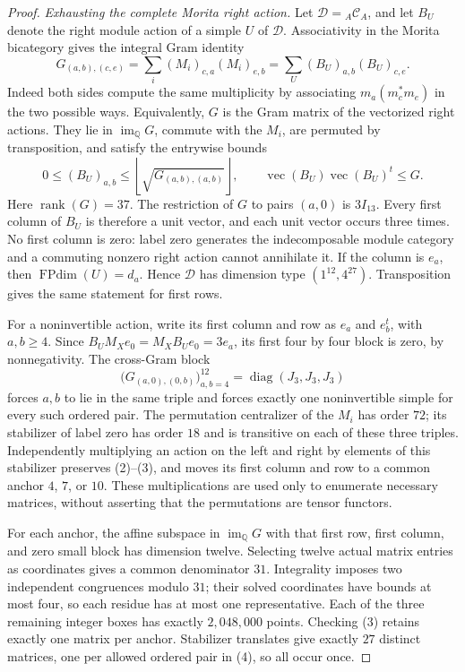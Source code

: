 \begin{proof}
\emph{Exhausting the complete Morita right action.}
Let $\mathcal D={}_A\mathcal C_A$, and let $B_U$ denote the right
module action of a simple $U$ of $\mathcal D$.
Associativity in the Morita bicategory gives the integral Gram
identity
\[
 G_{(a,b),(c,e)}=\sum_i(M_i)_{c,a}(M_i)_{e,b}
   =\sum_U(B_U)_{a,b}(B_U)_{c,e}.
 \tag{2}\label{eq:4982-full-Gram}
\]
Indeed both sides compute the same multiplicity by associating
$m_a(m_c^*m_e)$ in the two possible ways. Equivalently, $G$ is the
Gram matrix of the vectorized right actions. They lie in
$\operatorname{im}_{\mathbb Q}G$, commute with the $M_i$, are
permuted by transposition, and satisfy the entrywise bounds
\[
 0\leq (B_U)_{a,b}\leq
 \left\lfloor\sqrt{G_{(a,b),(a,b)}}\right\rfloor,
 \qquad \operatorname{vec}(B_U)\operatorname{vec}(B_U)^t\leq G.
 \tag{3}\label{eq:4982-action-bounds}
\]
Here $\operatorname{rank}(G)=37$.
The restriction of $G$ to pairs $(a,0)$ is $3I_{13}$.
Every first column of $B_U$ is therefore a unit vector, and each
unit vector occurs three times. No first column is zero: label
zero generates the indecomposable module category and a commuting
nonzero right action cannot annihilate it. If the column is $e_a$,
then $\operatorname{FPdim}(U)=d_a$. Hence $\mathcal D$ has dimension
type $(1^{12},4^{27})$. Transposition gives the same statement for
first rows.

For a noninvertible action, write its first column and row as
$e_a$ and $e_b^t$, with $a,b\geq4$. Since
$B_U M_X e_0=M_X B_U e_0=3e_a$, its first four by four block is
zero, by nonnegativity. The cross-Gram block
\[
 \bigl(G_{(a,0),(0,b)}\bigr)_{a,b=4}^{12}
      =\operatorname{diag}(J_3,J_3,J_3)
 \tag{4}\label{eq:4982-cross-Gram}
\]
forces $a,b$ to lie in the same triple and forces exactly one
noninvertible simple for every such ordered pair.
The permutation centralizer of the $M_i$ has order $72$; its
stabilizer of label zero has order $18$ and is transitive on each
of these three triples. Independently multiplying an action on the
left and right by elements of this stabilizer preserves (2)--(3),
and moves its first column and row to a common anchor $4$, $7$, or
$10$. These multiplications are used only to enumerate necessary
matrices, without asserting that the permutations are tensor functors.

For each anchor, the affine subspace in
$\operatorname{im}_{\mathbb Q}G$ with that first row, first column,
and zero small block has dimension twelve. Selecting twelve actual
matrix entries as coordinates gives a common denominator $31$.
Integrality imposes two independent congruences modulo $31$; their
solved coordinates have bounds at most four, so each residue has
at most one representative. Each of the three remaining integer
boxes has exactly $2{,}048{,}000$ points. Checking (3) retains
exactly one matrix per anchor. Stabilizer translates give exactly
$27$ distinct matrices, one per allowed ordered pair in (4), so all
occur once.


\end{proof}

